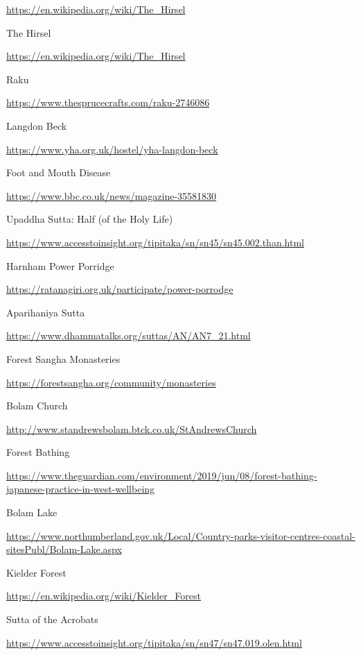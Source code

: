 \begin{thebibliography}{9}
  {\urlsize \url{https://en.wikipedia.org/wiki/The_Hirsel}}

 The Hirsel

  {\urlsize \url{https://en.wikipedia.org/wiki/The_Hirsel}}

 Raku

  {\urlsize \url{https://www.thesprucecrafts.com/raku-2746086}}

 Langdon Beck

  {\urlsize \url{https://www.yha.org.uk/hostel/yha-langdon-beck}}

 Foot and Mouth Disease

  {\urlsize \url{https://www.bbc.co.uk/news/magazine-35581830}}

 Upaddha Sutta: Half (of the Holy Life)

  {\urlsize \url{https://www.accesstoinsight.org/tipitaka/sn/sn45/sn45.002.than.html}}

 Harnham Power Porridge

  {\urlsize \url{https://ratanagiri.org.uk/participate/power-porrodge}}

 Aparihaniya Sutta

  {\urlsize \url{https://www.dhammatalks.org/suttas/AN/AN7_21.html}}

 Forest Sangha Monasteries

  {\urlsize \url{https://forestsangha.org/community/monasteries}}

 Bolam Church

  {\urlsize \url{http://www.standrewsbolam.btck.co.uk/StAndrewsChurch}}

 Forest Bathing

  {\urlsize \url{https://www.theguardian.com/environment/2019/jun/08/forest-bathing-japanese-practice-in-west-wellbeing}}

 Bolam Lake

  {\urlsize \url{https://www.northumberland.gov.uk/Local/Country-parks-visitor-centres-coastal-sitesPubl/Bolam-Lake.aspx}}

 Kielder Forest

  {\urlsize \url{https://en.wikipedia.org/wiki/Kielder_Forest}}

 Sutta of the Acrobats

  {\urlsize \url{https://www.accesstoinsight.org/tipitaka/sn/sn47/sn47.019.olen.html}}


\end{thebibliography}
